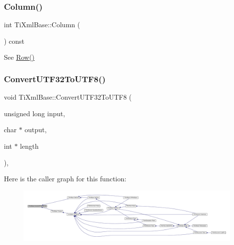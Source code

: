 \subsubsection{\texorpdfstring{Column()}{Column()}}
{\footnotesize\ttfamily int Ti\+Xml\+Base\+::\+Column (\begin{DoxyParamCaption}{ }\end{DoxyParamCaption}) const\hspace{0.3cm}{\ttfamily [inline]}}



See \hyperlink{class_ti_xml_base_ad0cacca5d76d156b26511f46080b442e}{Row()} 

\mbox{\label{class_ti_xml_base_a07c765e3a7f979d343e646ea797b180b}} 
\subsubsection{\texorpdfstring{Convert\+U\+T\+F32\+To\+U\+T\+F8()}{ConvertUTF32ToUTF8()}}
{\footnotesize\ttfamily void Ti\+Xml\+Base\+::\+Convert\+U\+T\+F32\+To\+U\+T\+F8 (\begin{DoxyParamCaption}\item[{unsigned long}]{input,  }\item[{char $\ast$}]{output,  }\item[{int $\ast$}]{length }\end{DoxyParamCaption})\hspace{0.3cm}{\ttfamily [static]}, {\ttfamily [protected]}}

Here is the caller graph for this function\+:\nopagebreak
\begin{figure}[H]
\begin{center}
\leavevmode
\includegraphics[width=350pt]{class_ti_xml_base_a07c765e3a7f979d343e646ea797b180b_icgraph}
\end{center}
\end{figure}
\mbox{\label{class_ti_xml_base_a32ed202562b58de64c7d799ca3c9db98}} 
